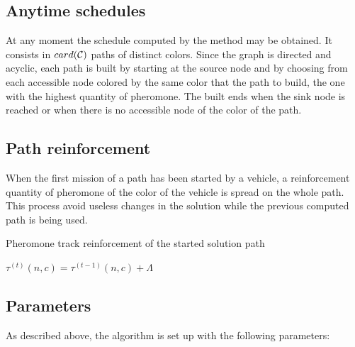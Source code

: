 \documentclass[review]{elsarticle}
\begin{document}
\subsection{Anytime schedules}
At any moment the schedule computed by the method may be obtained. It consists in $card(\cal{C})$ paths of distinct colors. Since the graph is directed and acyclic, each path is built by starting at the source node and by choosing from each accessible node colored by the same color that the path to build, the one with the highest quantity of pheromone. The built ends when the sink node is reached or when there is no accessible node of the color of the path.

\subsection{Path reinforcement}
When the first mission of a path has been started by a vehicle, a reinforcement quantity of pheromone of the color of the vehicle is spread on the whole path. This process avoid useless changes in the solution while the previous computed path is being used.


\begin{algorithm}
\caption{Pheromone track reinforcement of the started solution path}
\begin{algorithmic} 
\label{algoReinforcement}
\STATE $\tau^{(t)}(n,c) =  \tau^{(t-1)}(n,c) + \Lambda$
\ENDFOR
\end{algorithmic}
\end{algorithm}

\subsection{Parameters}
As described above, the algorithm is set up with the following parameters:
\end{document}
